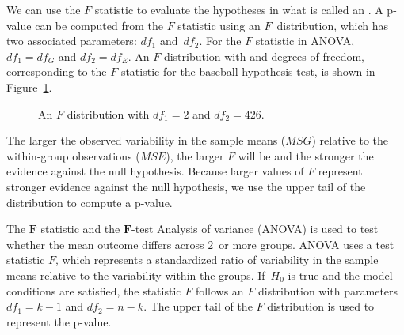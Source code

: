 We can use the $F$ statistic to evaluate the hypotheses in
what is called an .
A p-value can be computed from the $F$ statistic using
an $F$~distribution, which has two associated parameters:
$df_{1}$ and~$df_{2}$.
For the $F$ statistic in ANOVA,
$df_{1} = df_{G}$ and $df_{2} = df_{E}$.
An $F$ distribution with \mlbDFA{} and \mlbDFB{} degrees
of freedom, corresponding to the $F$ statistic for the
baseball hypothesis test, is shown in
Figure~\ref{fDist2And423Shaded}.

\begin{figure}[h]
  \centering
  \caption{An $F$ distribution with $df_1=2$ and $df_2=426$.}
  \label{fDist2And423Shaded}
\end{figure}

\D{\newpage}

The larger the observed variability in the sample
means ($MSG$) relative to the within-group observations ($MSE$),
the larger $F$ will be and the stronger the evidence against
the null hypothesis.
Because larger values of $F$ represent stronger evidence against
the null hypothesis, we use the upper tail of the distribution
to compute a p-value.

\begin{onebox}{The $\pmb{F}$ statistic and the
    $\pmb{F}$-test}
  Analysis of variance (ANOVA) is used to test whether
  the mean outcome differs across 2~or more groups.
  ANOVA uses a test statistic $F$, which represents
  a standardized ratio of variability in the sample means
  relative to the variability within the groups.
  If~$H_0$ is true and the model conditions are satisfied,
  the statistic $F$ follows an $F$ distribution with
  parameters $df_{1} = k - 1$ and $df_{2} = n - k$.
  The upper tail of the $F$ distribution is used to
  represent the p-value.
\end{onebox}


